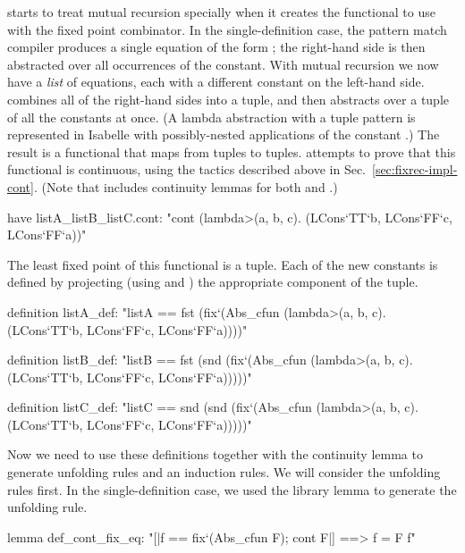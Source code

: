 {\fixrec} starts to treat mutual recursion specially when it creates the functional to use with the fixed point combinator. In the single-definition case, the pattern match compiler produces a single equation of the form ; the right-hand side is then abstracted over all occurrences of the constant. With mutual recursion we now have a \emph{list} of equations, each with a different constant on the left-hand side. {\fixrec} combines all of the right-hand sides into a tuple, and then abstracts over a tuple of all the constants at once. (A lambda abstraction with a tuple pattern is represented in Isabelle with possibly-nested applications of the constant .)  The result is a functional that maps from tuples to tuples. {\fixrec} attempts to prove that this functional is continuous, using the tactics described above in Sec.~\ref{sec:fixrec-impl-cont}. (Note that  includes continuity lemmas for both  and .)
%
\begin{isacode}
have listA_listB_listC.cont:
  "cont (\<lambda>(a, b, c). (LCons`TT`b, LCons`FF`c, LCons`FF`a))"
\end{isacode}
%
The least fixed point of this functional is a tuple. Each of the new constants is defined by projecting (using  and ) the appropriate component of the tuple.
%
\begin{isacode}
definition listA_def:
  "listA == fst
    (fix`(Abs_cfun (\<lambda>(a, b, c). (LCons`TT`b, LCons`FF`c, LCons`FF`a))))"
\end{isacode}
\unmedskip
{}
\begin{isacode}
definition listB_def:
  "listB == fst (snd
    (fix`(Abs_cfun (\<lambda>(a, b, c). (LCons`TT`b, LCons`FF`c, LCons`FF`a)))))"
\end{isacode}
\unmedskip
{}
\begin{isacode}
definition listC_def:
  "listC == snd (snd
    (fix`(Abs_cfun (\<lambda>(a, b, c). (LCons`TT`b, LCons`FF`c, LCons`FF`a)))))"
\end{isacode}
%
Now we need to use these definitions together with the continuity lemma to generate unfolding rules and an induction rules. We will consider the unfolding rules first. In the single-definition case, we used the library lemma  to generate the unfolding rule.
%
\begin{isacode}
lemma def_cont_fix_eq:
  "[|f == fix`(Abs_cfun F); cont F|] ==> f = F f"
\end{isacode}
